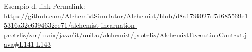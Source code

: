 \documentclass[a4paper,12pt]{report}
\begin{document}
Esempio di link
Permalink: \url{https://github.com/AlchemistSimulator/Alchemist/blob/d8a1799027d7d685569e15316a32e6394632ce71/alchemist-incarnation-protelis/src/main/java/it/unibo/alchemist/protelis/AlchemistExecutionContext.java#L141-L143}







\end{document}
